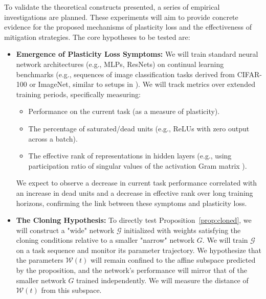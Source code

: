 \documentclass{article}
\begin{document}
To validate the theoretical constructs presented, a series of empirical investigations are planned. These experiments will aim to provide concrete evidence for the proposed mechanisms of plasticity loss and the effectiveness of mitigation strategies. The core hypotheses to be tested are:
\begin{itemize}
    \item \textbf{Emergence of Plasticity Loss Symptoms:} We will train standard neural network architectures (e.g., MLPs, ResNets) on continual learning benchmarks (e.g., sequences of image classification tasks derived from CIFAR-100 or ImageNet, similar to setups in \cite{dohare2024loss}). We will track metrics over extended training periods, specifically measuring:
        \begin{itemize}
            \item Performance on the current task (as a measure of plasticity).
            \item The percentage of saturated/dead units (e.g., ReLUs with zero output across a batch).
            \item The effective rank of representations in hidden layers (e.g., using participation ratio of singular values of the activation Gram matrix \cite{huh2022lowrank}).
        \end{itemize}
        We expect to observe a decrease in current task performance correlated with an increase in dead units and a decrease in effective rank over long training horizons, confirming the link between these symptoms and plasticity loss.

    \item \textbf{The Cloning Hypothesis:} To directly test Proposition~\ref{prop:cloned}, we will construct a "wide" network $\mathcal{G}$ initialized with weights satisfying the cloning conditions relative to a smaller "narrow" network $G$. We will train $\mathcal{G}$ on a task sequence and monitor its parameter trajectory. We hypothesize that the parameters $\mathcal{W}(t)$ will remain confined to the affine subspace predicted by the proposition, and the network's performance will mirror that of the smaller network $G$ trained independently. We will measure the distance of $\mathcal{W}(t)$ from this subspace.


\end{itemize}
\end{document}
